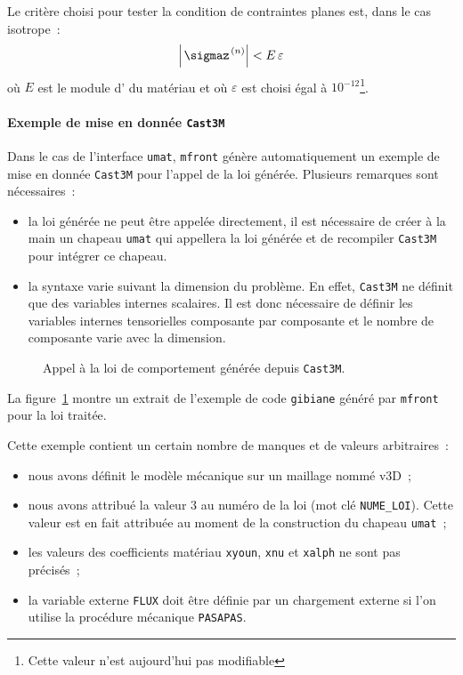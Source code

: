 \documentclass[rectoverso,pleiades,pstricks,leqno,anti]{texmf/note_technique_2010}
\newcommand{\mfront}{\texttt{mfront}}
\newcommand{\castem}{\texttt{Cast3M}}
\newcommand{\code}[1]{
  \psframebox[linecolor=ceaorange,shadow=true,blur=true]{
    \begin{minipage}[htbp]{1.0\linewidth}
      \ttfamily\scriptsize #1
    \end{minipage}
  }
}
\begin{document}
Le critère choisi pour tester la condition de contraintes planes est,
dans le cas isotrope~:
\[
\left|\left.\sigmaz\right.^{(n)}\right|<E\,\varepsilon
\]
où \(E\) est le module d' du matériau et où \(\varepsilon\)
est choisi égal à \(10^{-12}\)\footnote{Cette valeur n'est aujourd'hui
  pas modifiable}.

\paragraph{Exemple de mise en donnée \castem{}} Dans le cas
de l'interface \texttt{umat}, \mfront{} génère automatiquement
un exemple de mise en donnée \castem{} pour l'appel de la loi
générée. Plusieurs remarques sont nécessaires~:
\begin{itemize}
\item la loi générée ne peut être appelée directement, il est
nécessaire de créer à la main un chapeau \texttt{umat} qui
appellera la loi générée et de recompiler \castem{} pour
intégrer ce chapeau.
\item la syntaxe varie suivant la dimension du problème. En
effet, \castem{} ne définit que des variables internes
scalaires. Il est donc nécessaire de définir les variables
internes tensorielles composante par composante et le
nombre de composante varie avec la dimension.
\end{itemize}

\begin{figure}[htbp]
  \centering
  \code{{\ttfamily }}  
  \caption{Appel à la loi de comportement générée depuis \castem{}.}
  \label{fig:mfrontcastem}
\end{figure}

La figure~\ref{fig:mfrontcastem} montre un extrait de
l'exemple de code \texttt{gibiane} généré par \mfront{}
pour la loi traitée.

Cette exemple contient un certain nombre de manques et
de valeurs arbitraires~:
\begin{itemize}
\item nous avons définit le modèle mécanique sur un
  maillage nommé v3D~;
\item nous avons attribué la valeur \(3\) au numéro de
  la loi (mot clé \texttt{NUME\_LOI}). Cette valeur
  est en fait attribuée au moment de la construction
  du chapeau \texttt{umat}~;
\item les valeurs des coefficients matériau \texttt{xyoun},
  \texttt{xnu} et \texttt{xalph} ne sont pas précisés~;
\item la variable externe \texttt{FLUX} doit être définie
  par un chargement externe si l'on utilise la
  procédure mécanique \texttt{PASAPAS}.
\end{itemize}
\end{document}
